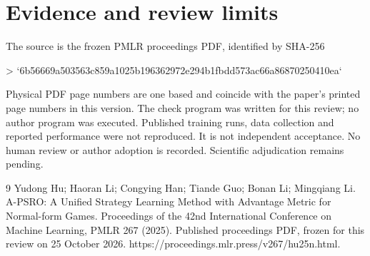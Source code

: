\documentclass[10pt]{article}
\begin{document}
\section*{Evidence and review limits}
The source is the frozen PMLR proceedings PDF, identified by SHA-256\par
> `6b56669a503563c859a1025b196362972e294b1fbdd573ac66a86870250410ea`\par
Physical PDF page numbers are one based and coincide with the paper’s printed page numbers in this version. The check program was written for this review; no author program was executed. Published training runs, data collection and reported performance were not reproduced. It is not independent acceptance. No human review or author adoption is recorded. Scientific adjudication remains pending.\par
9 Yudong Hu; Haoran Li; Congying Han; Tiande Guo; Bonan Li; Mingqiang Li. A-PSRO: A Unified Strategy Learning Method with Advantage Metric for Normal-form Games. Proceedings of the 42nd International Conference on Machine Learning, PMLR 267 (2025). Published proceedings PDF, frozen for this review on 25 October 2026. https://proceedings.mlr.press/v267/hu25n.html.\par
\end{document}
